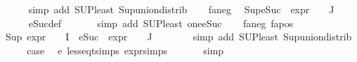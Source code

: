 \begin{isabellebody}
\ \ \ \ \isamarkupfalse%
\ {\isacharparenleft}{\kern0pt}simp\ add{\isacharcolon}{\kern0pt}\ SUP{\isacharunderscore}{\kern0pt}least\ Sup{\isacharunderscore}{\kern0pt}union{\isacharunderscore}{\kern0pt}distrib{\isacharparenright}{\kern0pt}\isanewline
\ \ \isamarkupfalse%
\ fa{\isacharunderscore}{\kern0pt}neg\ \isamarkupfalse%
\ {\isachardoublequoteopen}Sup{\isacharparenleft}{\kern0pt}{\isacharparenleft}{\kern0pt}eSuc\ {\isasymcirc}\ expr{\isacharunderscore}{\kern0pt}{}\ {\isasymcirc}\ {\isasymPhi}{\isacharparenright}{\kern0pt}\ {\isacharbackquote}{\kern0pt}\ J{\isacharparenright}{\kern0pt}\ {\isasymle}\ {}{\isachardoublequoteclose}\isanewline
\ \ \ \ \isamarkupfalse%
\ eSuc{\isacharunderscore}{\kern0pt}def\ \isanewline
\ \ \ \ \isamarkupfalse%
\ {\isacharparenleft}{\kern0pt}simp\ add{\isacharcolon}{\kern0pt}\ SUP{\isacharunderscore}{\kern0pt}least\ one{\isacharunderscore}{\kern0pt}eSuc{\isacharparenright}{\kern0pt}\isanewline
\ \ \isamarkupfalse%
\ fa{\isacharunderscore}{\kern0pt}neg\ fa{\isacharunderscore}{\kern0pt}pos\ \isamarkupfalse%
\ {\isachardoublequoteopen}{\isacharparenleft}{\kern0pt}Sup\ {\isacharparenleft}{\kern0pt}{\isacharparenleft}{\kern0pt}expr{\isacharunderscore}{\kern0pt}{}\ {\isasymcirc}\ {\isasymPhi}{\isacharparenright}{\kern0pt}\ {\isacharbackquote}{\kern0pt}\ I\ {\isasymunion}\ {\isacharparenleft}{\kern0pt}{\isacharparenleft}{\kern0pt}eSuc\ {\isasymcirc}\ expr{\isacharunderscore}{\kern0pt}{}\ {\isasymcirc}\ {\isasymPhi}{\isacharparenright}{\kern0pt}\ {\isacharbackquote}{\kern0pt}\ J{\isacharparenright}{\kern0pt}{\isacharparenright}{\kern0pt}{\isacharparenright}{\kern0pt}\ {\isasymle}\ {}{\isachardoublequoteclose}\isanewline
\ \ \ \ \isamarkupfalse%
\ {\isacharparenleft}{\kern0pt}simp\ add{\isacharcolon}{\kern0pt}\ SUP{\isacharunderscore}{\kern0pt}least\ Sup{\isacharunderscore}{\kern0pt}union{\isacharunderscore}{\kern0pt}distrib{\isacharparenright}{\kern0pt}\isanewline
\ \ \isamarkupfalse%
\ \isamarkupfalse%
\ {\isacharquery}{\kern0pt}case\ \isamarkupfalse%
\ e{}\ less{\isacharunderscore}{\kern0pt}eq{\isacharunderscore}{\kern0pt}t{\isachardot}{\kern0pt}simps\ expr{\isachardot}{\kern0pt}simps\ \isanewline
\ \ \ \ \isamarkupfalse%
\ simp\isanewline
{}\isamarkupfalse%
%
\endisatagproof
{\isafoldproof}%
%
\isadelimproof
\isanewline
%
\endisadelimproof
\isanewline

\end{isabellebody}
